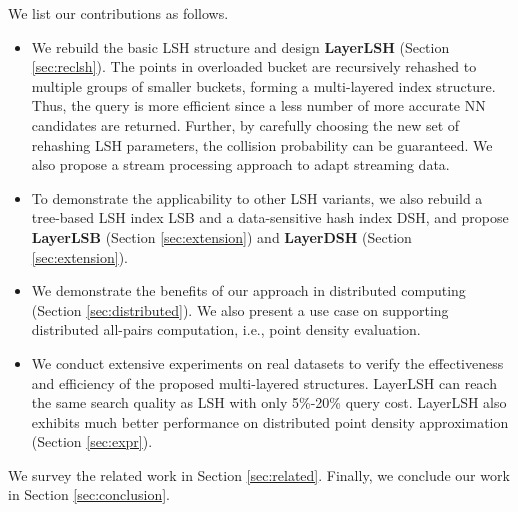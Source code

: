  We list our contributions as follows.
\begin{itemize}[leftmargin=*]
\item We rebuild the basic LSH structure and design \textbf{LayerLSH} (Section \ref{sec:reclsh}). The points in overloaded bucket are recursively rehashed to multiple groups of smaller buckets, forming a multi-layered index structure. Thus, the query is more efficient since a less number of more accurate NN candidates are returned. Further, by carefully choosing the new set of rehashing LSH parameters, the collision probability can be guaranteed. We also propose a stream processing approach to adapt streaming data.
\item To demonstrate the applicability to other LSH variants, we also rebuild a tree-based LSH index LSB and a data-sensitive hash index DSH, and propose \textbf{LayerLSB} (Section \ref{sec:extension}) and \textbf{LayerDSH} (Section \ref{sec:extension}).
\item We demonstrate the benefits of our approach in distributed computing (Section \ref{sec:distributed}). We also present a use case on supporting distributed all-pairs computation, i.e., point density evaluation.
\item We conduct extensive experiments on real datasets to verify the effectiveness and efficiency of the proposed multi-layered structures. LayerLSH can reach the same search quality as LSH with only 5\%-20\% query cost. LayerLSH also exhibits much better performance on distributed point density approximation (Section \ref{sec:expr}).
\end{itemize}

We survey the related work in Section \ref{sec:related}. Finally, we conclude our work in Section \ref{sec:conclusion}.
